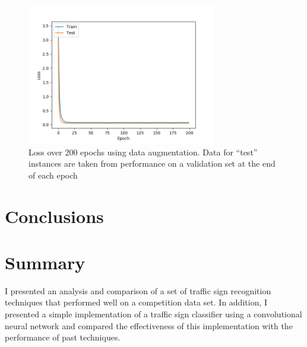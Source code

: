 \documentclass[letterpaper,twocolumn,10pt]{article}
\begin{document}
\begin{figure}
\includegraphics[width=3.25in]{loss}
\caption{Loss over 200 epochs using data augmentation. Data for ``test'' instances are taken from performance on a validation set at the end of each epoch}
\end{figure}


\section{Conclusions}


\section{Summary}

I presented an analysis and comparison of a set of traffic sign recognition techniques that performed well on a competition data set. In addition, I presented a simple implementation of a traffic sign classifier using a convolutional neural network and compared the effectiveness of this implementation with the performance of past techniques.


{\footnotesize 
}
\end{document}
